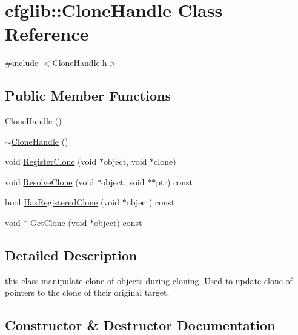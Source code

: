 \hypertarget{classcfglib_1_1CloneHandle}{}\section{cfglib\+:\+:Clone\+Handle Class Reference}
\label{classcfglib_1_1CloneHandle}


{\ttfamily \#include $<$Clone\+Handle.\+h$>$}

\subsection*{Public Member Functions}
\begin{DoxyCompactItemize}
\item 
\hyperlink{classcfglib_1_1CloneHandle_a34428ca2c5f3329aef2be11c3d373fc7}{Clone\+Handle} ()
\item 
\hyperlink{classcfglib_1_1CloneHandle_a6902117515dc30a73f7b51565ece724d}{$\sim$\+Clone\+Handle} ()
\item 
void \hyperlink{classcfglib_1_1CloneHandle_aa36eb7a49ba2b5c4a02e3ac1d99e4197}{Register\+Clone} (void $\ast$object, void $\ast$clone)
\item 
void \hyperlink{classcfglib_1_1CloneHandle_a16170b69d74009e625dcf968b65cfdc7}{Resolve\+Clone} (void $\ast$object, void $\ast$$\ast$ptr) const
\item 
bool \hyperlink{classcfglib_1_1CloneHandle_a2310c1f009fb8a3d7588cc68db017510}{Has\+Registered\+Clone} (void $\ast$object) const
\item 
void $\ast$ \hyperlink{classcfglib_1_1CloneHandle_a3db1f8cd4dfb5d594a94e89ff3899ee6}{Get\+Clone} (void $\ast$object) const
\end{DoxyCompactItemize}


\subsection{Detailed Description}
this class manipulate clone of objects during cloning. Used to update clone of pointers to the clone of their original target. 

\subsection{Constructor \& Destructor Documentation}
\mbox{\label{classcfglib_1_1CloneHandle_a34428ca2c5f3329aef2be11c3d373fc7}} 
